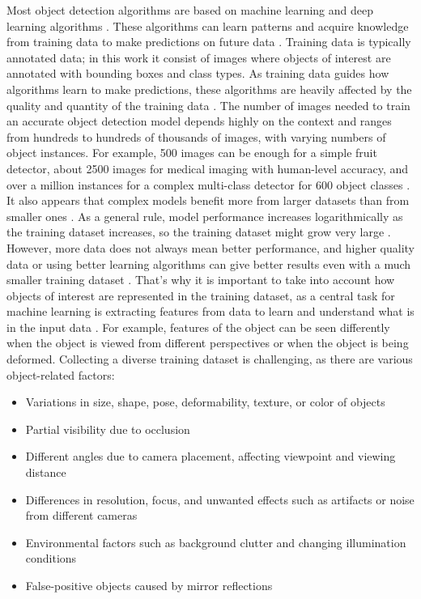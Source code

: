 Most object detection algorithms are based on machine learning and deep learning algorithms \cite{object_detection_review}. These algorithms can learn patterns and acquire knowledge from training data to make predictions on future data \cite{COHEN202113, MLDL}. Training data is typically annotated data; in this work it consist of images where objects of interest are annotated with bounding boxes and class types. As training data guides how algorithms learn to make predictions, these algorithms are heavily affected by the quality and quantity of the training data \cite{10689528,sun2017, mathematicaltheorydeepconvolutional}. 
The number of images needed to train an accurate object detection model depends highly on the context and ranges from hundreds to hundreds of thousands of images, with varying numbers of object instances. For example, 500 images can be enough for a simple fruit detector, about 2500 images for medical imaging with human-level accuracy, and over a million instances for a complex multi-class detector for 600 object classes \cite{optimalfruit, optimalmedic, Kuznetsova_2020}. It also appears that complex models benefit more from larger datasets than from smaller ones \cite{Kuznetsova_2020}. As a general rule, model performance increases logarithmically as the training dataset increases, so the training dataset might grow very large \cite{sun2017}. However, more data does not always mean better performance, and higher quality data or using better learning algorithms can give better results even with a much smaller training dataset \cite{Zhu_2015}. That's why it is important to take into account how objects of interest are represented in the training dataset, as a central task for machine learning is extracting features from data to learn and understand what is in the input data \cite{Pandey2023, mathematicaltheorydeepconvolutional}. For example, features of the object can be seen differently when the object is viewed from different perspectives or when the object is being deformed. Collecting a diverse training dataset is challenging, as there are various object-related factors:

\begin{itemize}
    \item Variations in size, shape, pose, deformability, texture, or color of objects \cite{deformable, shapetexturecolor}
    \item Partial visibility due to occlusion \cite{ocl2022}
    \item Different angles due to camera placement, affecting viewpoint and viewing distance \cite{distance, angle}
    \item Differences in resolution, focus, and unwanted effects such as artifacts or noise from different cameras \cite{Molloy2024blur,You2023depth}
    \item Environmental factors such as background clutter and changing illumination conditions \cite{Mukhopadhyay2024}
    \item False-positive objects caused by mirror reflections \cite{reflectedbenchmark, mirror, maritime}
\end{itemize}

